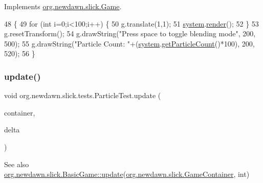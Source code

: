 Implements \mbox{\hyperlink{interfaceorg_1_1newdawn_1_1slick_1_1_game_af1a4670d43eb3ba04dfcf55ab1975b64}{org.\+newdawn.\+slick.\+Game}}.


\begin{DoxyCode}
48                                                             \{
49         \textcolor{keywordflow}{for} (\textcolor{keywordtype}{int} i=0;i<100;i++) \{
50             g.translate(1,1);
51             \mbox{\hyperlink{classorg_1_1newdawn_1_1slick_1_1tests_1_1_particle_test_a6daed8a7245faff147f4e66159df9c0d}{system}}.\mbox{\hyperlink{classorg_1_1newdawn_1_1slick_1_1particles_1_1_particle_system_a81fd0123e1b180410a33e80a052cbfac}{render}}();
52         \}
53         g.resetTransform();
54         g.drawString(\textcolor{stringliteral}{"Press space to toggle blending mode"}, 200, 500);
55         g.drawString(\textcolor{stringliteral}{"Particle Count: "}+(\mbox{\hyperlink{classorg_1_1newdawn_1_1slick_1_1tests_1_1_particle_test_a6daed8a7245faff147f4e66159df9c0d}{system}}.\mbox{\hyperlink{classorg_1_1newdawn_1_1slick_1_1particles_1_1_particle_system_ad1e56b931fe0d2cea32cd23ff6d6a8fa}{getParticleCount}}()*100), 200, 520);
56     \}
\end{DoxyCode}
\mbox{\label{classorg_1_1newdawn_1_1slick_1_1tests_1_1_particle_test_a233c08b351b52638bc1e1bb5a4d6e479}} 
\subsubsection{\texorpdfstring{update()}{update()}}
{\footnotesize\ttfamily void org.\+newdawn.\+slick.\+tests.\+Particle\+Test.\+update (\begin{DoxyParamCaption}\item[{\mbox{\hyperlink{classorg_1_1newdawn_1_1slick_1_1_game_container}{Game\+Container}}}]{container,  }\item[{int}]{delta }\end{DoxyParamCaption})\hspace{0.3cm}{\ttfamily [inline]}}

\begin{DoxySeeAlso}{See also}
\mbox{\hyperlink{classorg_1_1newdawn_1_1slick_1_1_basic_game_acfe6fa05aef83bff1631af91a3e4bd20}{org.\+newdawn.\+slick.\+Basic\+Game\+::update}}(\mbox{\hyperlink{classorg_1_1newdawn_1_1slick_1_1_game_container}{org.\+newdawn.\+slick.\+Game\+Container}}, int) 
\end{DoxySeeAlso}


